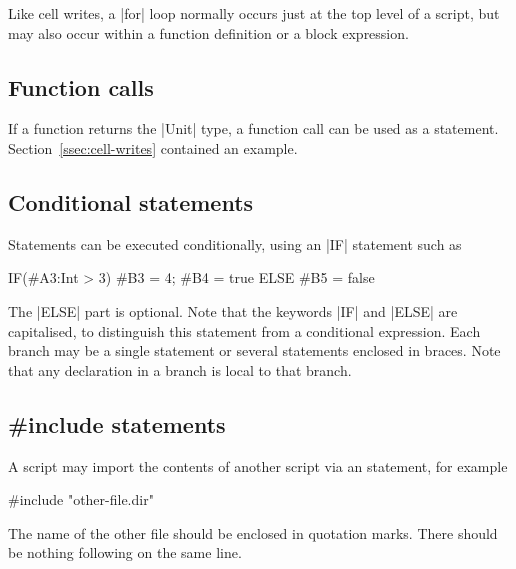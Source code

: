 Like cell writes, a |for| loop normally occurs just at the top level of a
script, but may also occur within a function definition or a block expression.


\subsection{Function calls}
\label{sec:function-calls}

If a function returns the |Unit| type, a function call can be used as a
statement.  Section~\ref{ssec:cell-writes} contained an example. 


\subsection{Conditional statements}

Statements can be executed conditionally, using an |IF| statement such as
\begin{scala}
IF(#A3:Int > 3){ #B3 = 4; #B4 = true } ELSE #B5 = false
\end{scala}
The |ELSE| part is optional.  
Note that the keywords |IF| and |ELSE| are capitalised, to distinguish this
statement from a conditional expression.  Each branch may be a single
statement or several statements enclosed in braces.  Note that any declaration
in a branch is local to that branch. 


\subsection{{\scalashape \#include} statements}

A script may import the contents of another script via an 
statement, for example
\begin{scala}
#include "other-file.dir"
\end{scala}
The name of the other file should be enclosed in quotation marks.  There
should be nothing following on the same line.


